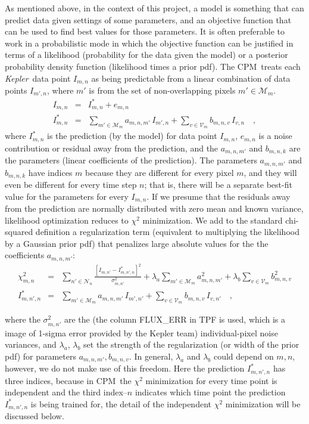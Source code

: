 \documentclass[12pt, preprint]{aastex}
\newcommand{\project}[1]{\textsl{#1}}
\newcommand{\Kepler}{\project{Kepler}}
\newcommand{\name}{CPM}
\newcommand{\set}[1]{\mathcal{#1}}
\begin{document}
As mentioned above, in the context of this project,
  a model is something that can predict data given settings of some parameters,
  and an objective function that can be used to find best values for those parameters.
It is often preferable to work in a probabilistic mode in which the objective function can be justified
  in terms of a likelihood (probability for the data given the model)
  or a posterior probability density function (likelihood times a prior pdf).
The \name\ treats each \Kepler\ data point $I_{m,n}$ as being
  predictable from a linear combination of data points $I_{m',n}$,
  where $m'$ is from the set of non-overlapping pixels $m'\in\set{M}_m$.
\begin{eqnarray}
I_{m,n}         &=& I^{\ast}_{m,n} + e_{m,n}
\\
I^{\ast}_{m,n}  &=& \sum_{m'\in\set{M}_m} a_{m,n,m'}\,I_{m',n} + \sum_{v\in\set{V}_m} b_{m,n,v}\,I_{v,n}
\quad,
\end{eqnarray}
where $I^{\ast}_{m,n}$ is the prediction (by the model) for data point $I_{m,n}$,
  $e_{m,n}$ is a noise contribution or residual away from the prediction,
  and the $a_{m,n,m'}$ and $b_{m,n,k}$ are the parameters (linear coefficients of the prediction).
The parameters $a_{m,n,m'}$ and $b_{m,n,k}$ have indices $m$ because
  they are different for every pixel $m$,
  and they will even be different for every time step $n$;
  that is, there will be a separate best-fit value for the parameters for every $I_{m,n}$.
If we presume that the residuals away from the prediction are normally distributed with zero mean
  and known variance,
  likelihood optimization reduces to $\chi^2$ minimization.
We add to the standard chi-squared definition a regularization term
  (equivalent to multiplying the likelihood by a Gaussian prior pdf)
  that penalizes large absolute values for the the coefficients $a_{m,n,m'}$:
\begin{eqnarray}
\chi^2_{m,n}    &=& \sum_{n'\in\set{N}_n} \frac{[I_{m,n'} - I^{\ast}_{m,n',n}]^2}{\sigma^2_{m,n'}}
                 + \lambda_{a}\sum_{m'\in\set{M}_m}a_{m,n,m'}^2 + \lambda_{b}\sum_{v\in\set{V}_m}b_{m,n,v}^2
\\
I^{\ast}_{m,n',n} &=& \sum_{m'\in\set{M}_m} a_{m,n,m'}\,I_{m',n'} + \sum_{v\in\set{V}_m} b_{m,n,v}\,I_{v,n'}
\quad,
\end{eqnarray}

where the $\sigma^2_{m,n'}$ are the (the column FLUX\_ERR in TPF is used, which is a image of 1-sigma error provided by the Kepler team) individual-pixel noise variances, and $\lambda_{a}$, 
  $\lambda_{b}$ set the strength of the regularization (or width of the prior pdf) for parameters $a_{m,n,m'}, b_{m,n,v}$. 
  In general, $\lambda_a$ and $\lambda_b$ could depend on $m,n$, however, we do not make use of this freedom. 
  Here the prediction $I^{\ast}_{m,n',n}$ has three indices, 
  because in \name\ the $\chi^2$ minimization for every time
  point is independent and the third index--$n$ indicates 
  which time point the prediction $I^{\ast}_{m,n',n}$ is being trained for, 
  the detail of the independent $\chi^2$ minimization will be discussed below.
\end{document}
